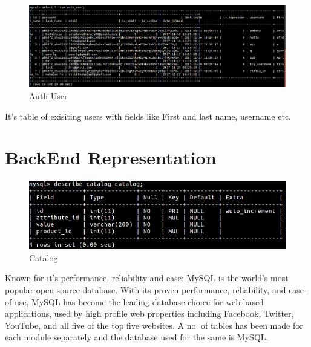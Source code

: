 \begin{figure}[h!]
\centering \includegraphics[scale=0.4]{input/images/t3.png}
\caption{ Auth User}
\label{fig:UI1}
\end{figure}
It's table of exisiting users with fields like First and last name, username etc.
\newpage

\section{BackEnd Representation}
\begin{figure}[h!]
\centering \includegraphics[scale=0.4]{input/images/t2.png}
\caption{ Catalog}
\label{fig:UI1}
\end{figure}

Known for it's performance, reliability and ease: MySQL is the world's most popular open source database. With its proven performance, reliability, and ease-of-use, MySQL has become the leading database choice for web-based applications, used by high profile web properties including Facebook, Twitter, YouTube, and all five of the top five websites.
A no. of tables has been made for each module separately and the database used for the same is MySQL.

\section{}